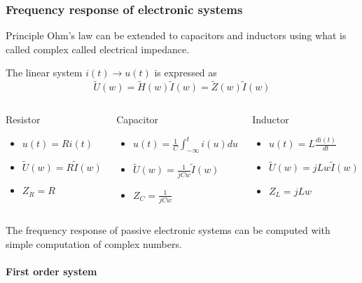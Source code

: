         \frametitle{Frequency response of electronic systems}
 
\begin{block}{Principle}
  Ohm's law can be extended to capacitors and inductors using what is called complex called electrical impedance.
\end{block}
The linear system $i(t)\rightarrow u(t)$ is expressed as
$$\tilde U(w)=\tilde H(w)\tilde I(w)=\tilde Z(w)\tilde I(w)$$
\vspace{-5mm}
\begin{columns}[t]
  \begin{column}%
    \begin{block}{Resistor}
      \begin{itemize}
      \item
$u(t)=Ri(t)$
\item \pause $\tilde U(w)=R\tilde I(w)$
\item $Z_R=R$
      \end{itemize}
    \end{block}
  \end{column}
  \begin{column}%
    \begin{block}{Capacitor}
      \begin{itemize}
      \item
$u(t)=\frac{1}{C}\int_{-\infty}^ti(u)du$
\item \pause $\tilde U(w)=\frac{1}{jCw}\tilde I(w)$
\item $Z_C=\frac{1}{jCw}$
      \end{itemize}
    \end{block}
  \end{column}
  \begin{column}%
    \begin{block}{Inductor}
      \begin{itemize}
      \item
$u(t)=L\frac{di(t)}{dt}$
\item \pause $\tilde U(w)=jLw\tilde I(w)$
\item $Z_L=jLw$
      \end{itemize}
    \end{block}
  \end{column}
\end{columns}
The frequency response of passive electronic systems can be computed with simple
computation of complex numbers.

\paragraph{First order system}

